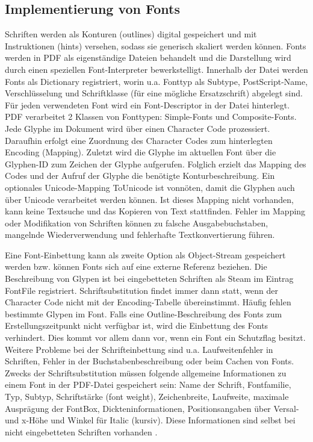 \subsection{Implementierung von Fonts}
Schriften werden als Konturen (outlines) digital gespeichert und mit Instruktionen (hints) versehen, sodass sie generisch skaliert werden können. Fonts werden in PDF als eigenständige Dateien behandelt und die Darstellung wird durch einen speziellen Font-Interpreter bewerkstelligt. Innerhalb der Datei werden Fonts als Dictionary registriert, worin u.a. Fonttyp als Subtype, PostScript-Name, Verschlüsselung und Schriftklasse (für eine mögliche Ersatzschrift) abgelegt sind. Für jeden verwendeten Font wird ein Font-Descriptor in der Datei hinterlegt. PDF verarbeitet 2 Klassen von Fonttypen: Simple-Fonts und Composite-Fonts. Jede Glyphe im Dokument wird über einen Character Code prozessiert. Daraufhin erfolgt eine Zuordnung des Character Codes zum hinterlegten Encoding (Mapping). Zuletzt wird die Glyphe im aktuellen Font über die Glyphen-ID zum Zeichen der Glyphe aufgerufen. Folglich erzielt das Mapping des Codes und der Aufruf der Glyphe die benötigte Konturbeschreibung. Ein optionales Unicode-Mapping ToUnicode ist vonnöten, damit die Glyphen auch über Unicode verarbeitet werden können. Ist dieses Mapping nicht vorhanden, kann keine Textsuche und das Kopieren von Text stattfinden. Fehler im Mapping oder Modifikation von Schriften können zu falsche Ausgabebuchstaben, mangelnde Wiederverwendung und fehlerhafte Textkonvertierung führen.
\par
Eine Font-Einbettung kann als zweite Option als Object-Stream gespeichert werden bzw. können Fonts sich auf eine externe Referenz beziehen. Die Beschreibung von Glypen ist bei eingebetteten Schriften als Steam im Eintrag FontFile registriert. Schriftsubstitution findet immer dann statt, wenn der Character Code nicht mit der Encoding-Tabelle übereinstimmt. Häufig fehlen bestimmte Glypen im Font. Falls eine Outline-Beschreibung des Fonts zum Erstellungszeitpunkt nicht verfügbar ist, wird die Einbettung des Fonts verhindert. Dies kommt vor allem dann vor, wenn ein Font ein Schutzflag besitzt. Weitere Probleme bei der Schrifteinbettung sind u.a. Laufweitenfehler in Schriften, Fehler in der Buchstabenbeschreibung oder beim Cachen von Fonts. Zwecks der Schriftsubstitution müssen folgende allgemeine Informationen zu einem Font in der PDF-Datei gespeichert sein: Name der Schrift, Fontfamilie, Typ, Subtyp, Schriftstärke (font weight), Zeichenbreite, Laufweite, maximale Ausprägung der FontBox, Dickteninformationen, Positionsangaben über Versal- und x-Höhe und Winkel für Italic (kursiv). Diese Informationen sind selbst bei nicht eingebetteten Schriften vorhanden \cite{schneeberger}. 